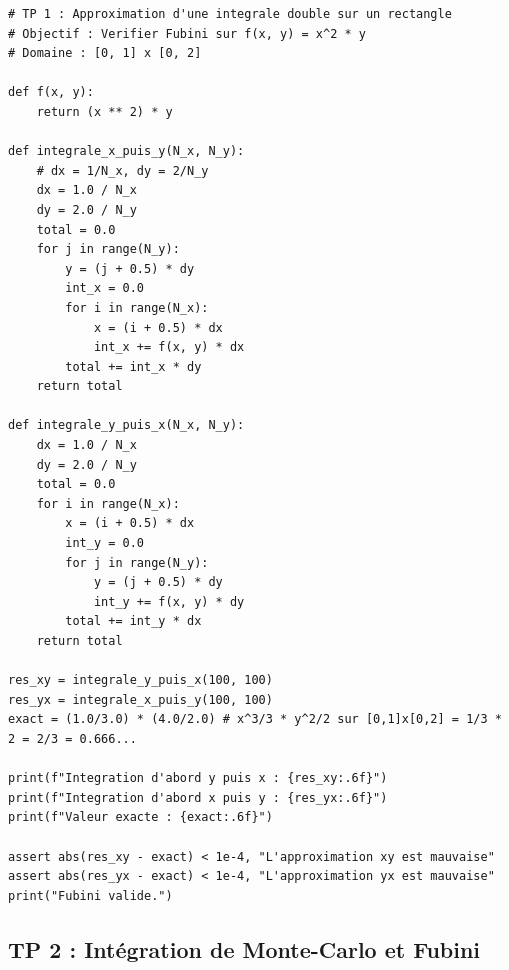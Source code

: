 \documentclass[11pt,a4paper]{article}
\begin{document}
\begin{lstlisting}
# TP 1 : Approximation d'une integrale double sur un rectangle
# Objectif : Verifier Fubini sur f(x, y) = x^2 * y
# Domaine : [0, 1] x [0, 2]

def f(x, y):
    return (x ** 2) * y

def integrale_x_puis_y(N_x, N_y):
    # dx = 1/N_x, dy = 2/N_y
    dx = 1.0 / N_x
    dy = 2.0 / N_y
    total = 0.0
    for j in range(N_y):
        y = (j + 0.5) * dy
        int_x = 0.0
        for i in range(N_x):
            x = (i + 0.5) * dx
            int_x += f(x, y) * dx
        total += int_x * dy
    return total

def integrale_y_puis_x(N_x, N_y):
    dx = 1.0 / N_x
    dy = 2.0 / N_y
    total = 0.0
    for i in range(N_x):
        x = (i + 0.5) * dx
        int_y = 0.0
        for j in range(N_y):
            y = (j + 0.5) * dy
            int_y += f(x, y) * dy
        total += int_y * dx
    return total

res_xy = integrale_y_puis_x(100, 100)
res_yx = integrale_x_puis_y(100, 100)
exact = (1.0/3.0) * (4.0/2.0) # x^3/3 * y^2/2 sur [0,1]x[0,2] = 1/3 * 2 = 2/3 = 0.666...

print(f"Integration d'abord y puis x : {res_xy:.6f}")
print(f"Integration d'abord x puis y : {res_yx:.6f}")
print(f"Valeur exacte : {exact:.6f}")

assert abs(res_xy - exact) < 1e-4, "L'approximation xy est mauvaise"
assert abs(res_yx - exact) < 1e-4, "L'approximation yx est mauvaise"
print("Fubini valide.")
\end{lstlisting}


\subsection*{TP 2 : Intégration de Monte-Carlo et Fubini}
\end{document}
